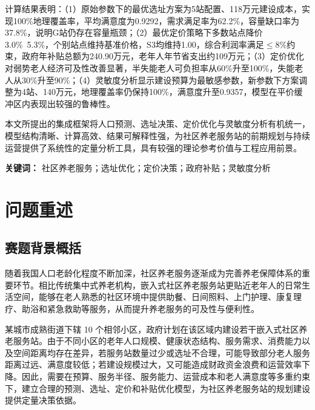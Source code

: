\documentclass[UTF8]{ctexart}
\begin{document}
\vspace{0.2cm}

计算结果表明：（1）原始参数下的最优选址方案为5站配置、118万元建设成本，实现100\%地理覆盖率，平均满意度为0.9292，需求满足率为62.2\%，容量缺口率为37.8\%，说明G站仍存在容量瓶颈；（2）最优定价策略下多数站点降价3.0\%~5.3\%，个别站点维持基准价格，S3均维持1.00，综合利润率满足$\leq 8\%$约束，政府年补贴总额为240.90万元，老年人年节省支出约109万元；（3）定价优化对弱势老人经济可及性改善显著，半失能老人可负担率从60\%升至100\%，失能老人从30\%升至90\%；（4）灵敏度分析显示建设预算为最敏感参数，新参数下方案调整为4站、140万元，地理覆盖率仍保持100\%，满意度升至0.9357，模型在平价缓冲区内表现出较强的鲁棒性。

\vspace{0.2cm}

本文所提出的集成框架将人口预测、选址决策、定价优化与灵敏度分析有机统一，模型结构清晰、计算高效、结果可解释性强，为社区养老服务站的前期规划与持续运营提供了系统性的定量分析工具，具有较强的理论参考价值与工程应用前景。

\vspace{0.5cm}

\noindent \textbf{关键词：} 社区养老服务；选址优化；定价决策；政府补贴；灵敏度分析


\newpage

\section{问题重述}

\subsection{赛题背景概括}

随着我国人口老龄化程度不断加深，社区养老服务逐渐成为完善养老保障体系的重要环节。相比传统集中式养老机构，嵌入式社区养老服务站更贴近老年人的日常生活空间，能够在老人熟悉的社区环境中提供助餐、日间照料、上门护理、康复理疗、助浴和紧急救助等服务，从而提升养老服务的可及性与便利性。

某城市成熟街道下辖 10 个相邻小区，政府计划在该区域内建设若干嵌入式社区养老服务站。由于不同小区的老年人口规模、健康状态结构、服务需求、消费能力以及空间距离均存在差异，若服务站数量过少或选址不合理，可能导致部分老人服务距离过远、满意度较低；若建设规模过大，又可能造成财政资金浪费和运营效率下降。因此，需要在预算、服务半径、服务能力、运营成本和老人满意度等多重约束下，建立合理的预测、选址、定价和补贴优化模型，为社区养老服务站的规划建设提供定量决策依据。
\end{document}
